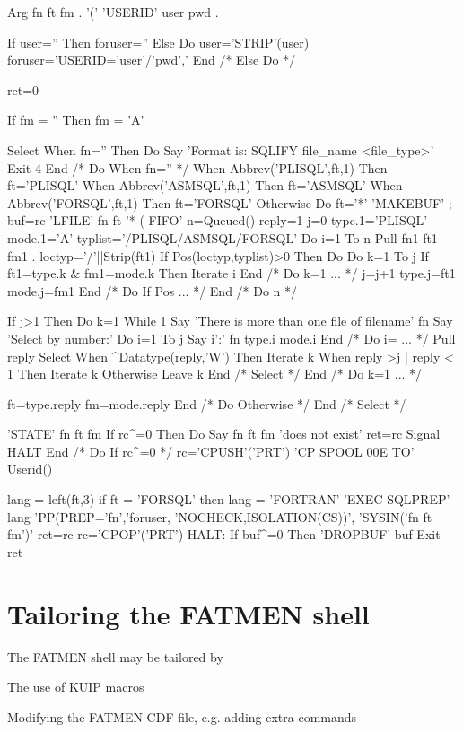 \begin{XMP}
Arg fn ft fm . '(' 'USERID' user pwd .
 
If user='' Then foruser=''
   Else Do
      user='STRIP'(user)
      foruser='USERID='user'/'pwd','
      End   /* Else Do */
 
 
ret=0
 
If fm = '' Then fm = 'A'
 
Select
   When fn='' Then Do
      Say 'Format is: SQLIFY file_name <file_type>'
      Exit 4
      End   /* Do When fn='' */
   When Abbrev('PLISQL',ft,1) Then ft='PLISQL'
   When Abbrev('ASMSQL',ft,1) Then ft='ASMSQL'
   When Abbrev('FORSQL',ft,1) Then ft='FORSQL'
   Otherwise Do
      ft='*'
      'MAKEBUF' ; buf=rc
      'LFILE' fn ft '* ( FIFO'
      n=Queued()
      reply=1
      j=0
      type.1='PLISQL'
      mode.1='A'
      typlist='/PLISQL/ASMSQL/FORSQL'
      Do i=1 To n
         Pull fn1 ft1 fm1 .
         loctyp='/'||Strip(ft1)
         If Pos(loctyp,typlist)>0 Then Do
            Do k=1 To j
               If ft1=type.k & fm1=mode.k Then Iterate i
               End   /* Do k=1 ... */
            j=j+1
            type.j=ft1
            mode.j=fm1
            End   /* Do If Pos ... */
         End   /* Do n */
 
      If j>1 Then Do k=1 While 1
         Say 'There is more than one file of filename' fn
         Say 'Select by number:'
         Do i=1 To j
            Say i':' fn type.i mode.i
            End   /* Do i= ... */
         Pull reply
         Select
            When ^Datatype(reply,'W') Then Iterate k
            When reply >j | reply < 1 Then Iterate k
            Otherwise Leave k
            End   /* Select */
         End   /* Do k=1 ... */
 
      ft=type.reply
      fm=mode.reply
      End   /* Do Otherwise */
   End   /* Select */
 
'STATE' fn ft fm
If rc^=0 Then Do
   Say fn ft fm 'does not exist'
   ret=rc
   Signal HALT
   End   /* Do If rc^=0 */
rc='CPUSH'('PRT')
'CP SPOOL 00E TO' Userid()
 
lang = left(ft,3)
if ft = 'FORSQL' then lang = 'FORTRAN'
'EXEC SQLPREP' lang 'PP(PREP='fn','foruser,
                 'NOCHECK,ISOLATION(CS))',
                 'SYSIN('fn ft fm')'
ret=rc
rc='CPOP'('PRT')
HALT:
If buf^=0 Then 'DROPBUF' buf
Exit ret
\end{XMP}
\section{Tailoring the FATMEN shell}
\par
The FATMEN shell may be tailored by
\begin{OL}
\item
The use of KUIP macros
\item
Modifying the FATMEN CDF file, e.g. adding extra commands
\end{OL}
